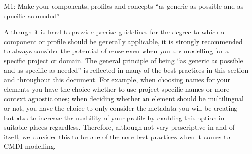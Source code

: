 \label{m1}
M1: Make your components, profiles and concepts ``as generic as possible and as specific as needed''


Although it is hard to provide precise guidelines for the degree to which a component or profile should be generally applicable, it is strongly recommended to always consider the potential of reuse even when you are modelling for a specific project or domain. The general principle of being ``as generic as possible and as specific as needed'' is reflected in many of the best practices in this section and throughout this document. For example, when choosing names for your elements you have the choice whether to use project specific names or
more context agnostic ones; when deciding whether an element should be multilingual or not, you have the choice to only consider the metadata you will be creating but also to increase the usability of your profile by enabling this option in suitable places regardless. Therefore, although not very prescriptive in and of itself, we consider this to be one of the core best practices when it comes to CMDI modelling.
